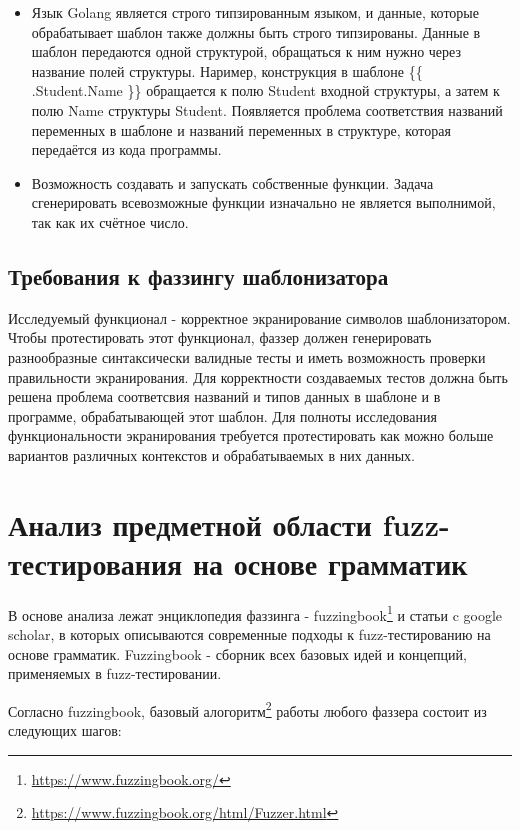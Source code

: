 \documentclass[a4paper]{article}
\begin{document}
\begin{itemize}
    \item Язык Golang является строго типзированным языком, и данные, которые обрабатывает шаблон также должны быть строго типзированы. Данные в шаблон передаются одной структурой, обращаться к ним нужно через название полей структуры. Наример, конструкция в шаблоне \{\{ .Student.Name \}\} обращается к полю Student входной структуры, а затем к полю Name структуры Student. Появляется проблема соответствия названий переменных в шаблоне и названий переменных в структуре, которая передаётся из кода программы. 
    \item Возможность создавать и запускать собственные функции. Задача сгенерировать всевозможные функции изначально не является выполнимой, так как их счётное число.
\end{itemize}

\subsection{Требования к фаззингу шаблонизатора}

Исследуемый функционал - корректное экранирование символов шаблонизатором. Чтобы протестировать этот функционал, фаззер должен генерировать разнообразные синтаксически валидные тесты и иметь возможность проверки правильности экранирования. Для корректности создаваемых тестов должна быть решена проблема соответсвия названий и типов данных в шаблоне и в программе, обрабатывающей этот шаблон. Для полноты исследования функциональности экранирования требуется протестировать как можно больше вариантов различных контекстов и обрабатываемых в них данных.

\newpage
\section{Анализ предметной области fuzz-тестирования на основе грамматик}
\indent

В основе анализа лежат энциклопедия фаззинга - fuzzingbook\footnote{\href{https://www.fuzzingbook.org/}{https://www.fuzzingbook.org/}} и статьи c google scholar, в которых описываются современные подходы к fuzz-тестированию на основе грамматик. Fuzzingbook - сборник всех базовых идей и концепций, применяемых в fuzz-тестировании.

Согласно fuzzingbook, базовый алогоритм\footnote{\href{https://www.fuzzingbook.org/html/Fuzzer.html}{https://www.fuzzingbook.org/html/Fuzzer.html}} работы любого фаззера состоит из следующих шагов:
\end{document}
